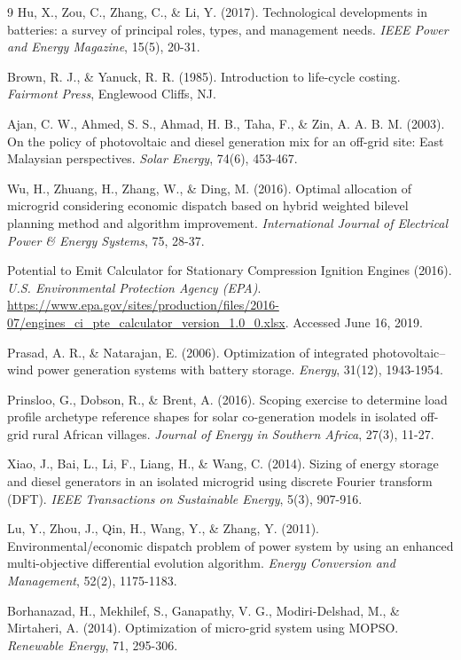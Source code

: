 \documentclass[final,3p,times]{elsarticle}
\begin{document}
\begin{thebibliography}{9}
Hu, X., Zou, C., Zhang, C., \& Li, Y. (2017). Technological developments in batteries: a survey of principal roles, types, and management needs. \textit{IEEE Power and Energy Magazine}, 15(5), 20-31.

Brown, R. J., \& Yanuck, R. R. (1985). Introduction to life-cycle costing. \textit{Fairmont Press}, Englewood Cliffs, NJ.

Ajan, C. W., Ahmed, S. S., Ahmad, H. B., Taha, F., \& Zin, A. A. B. M. (2003). On the policy of photovoltaic and diesel generation mix for an off-grid site: East Malaysian perspectives. \textit{Solar Energy}, 74(6), 453-467.

Wu, H., Zhuang, H., Zhang, W., \& Ding, M. (2016). Optimal allocation of microgrid considering economic dispatch based on hybrid weighted bilevel planning method and algorithm improvement. \textit{International Journal of Electrical Power \& Energy Systems}, 75, 28-37.

Potential to Emit Calculator for Stationary Compression Ignition Engines (2016). \textit{U.S. Environmental Protection Agency (EPA)}.
\url{https://www.epa.gov/sites/production/files/2016-07/engines_ci_pte_calculator_version_1.0_0.xlsx}. Accessed June 16, 2019.

Prasad, A. R., \& Natarajan, E. (2006). Optimization of integrated photovoltaic–wind power generation systems with battery storage. \textit{Energy}, 31(12), 1943-1954.

Prinsloo, G., Dobson, R., \& Brent, A. (2016). Scoping exercise to determine load profile archetype reference shapes for solar co-generation models in isolated off-grid rural African villages. \textit{Journal of Energy in Southern Africa}, 27(3), 11-27.

Xiao, J., Bai, L., Li, F., Liang, H., \& Wang, C. (2014). Sizing of energy storage and diesel generators in an isolated microgrid using discrete Fourier transform (DFT). \textit{IEEE Transactions on Sustainable Energy}, 5(3), 907-916.

Lu, Y., Zhou, J., Qin, H., Wang, Y., \& Zhang, Y. (2011). Environmental/economic dispatch problem of power system by using an enhanced multi-objective differential evolution algorithm. \textit{Energy Conversion and Management}, 52(2), 1175-1183.

Borhanazad, H., Mekhilef, S., Ganapathy, V. G., Modiri-Delshad, M., \& Mirtaheri, A. (2014). Optimization of micro-grid system using MOPSO. \textit{Renewable Energy}, 71, 295-306.


\end{thebibliography}
\end{document}
